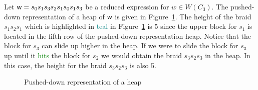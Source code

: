 \begin{example}
Let $\mathsf{w}=s_0s_1s_3s_2s_1s_0s_1s_3$ be a reduced expression for $w \in W(C_3)$. The pushed-down representation of a heap of $\mathsf{w}$ is given in Figure~\ref{fig:pusheddownheap}. The height of the braid $s_1s_2s_1$ which is highlighted in \textcolor{teal}{teal} in Figure~\ref{fig:pusheddownheap} is 5 since the upper block for $s_1$ is located in the fifth row of the pushed-down representation heap. Notice that the block for $s_3$ can slide up higher in the heap. If we were to slide the block for $s_3$ up until it \textcolor{green}{hits} the block for $s_2$ we would obtain the braid $s_3s_2s_3$ in the heap. In this case, the height for the braid $s_3s_2s_3$ is also 5.   

\begin{figure}[h!] \centering
{}	
\caption{Pushed-down representation of a heap}\label{fig:pusheddownheap}
\end{figure}

	
\end{example}


